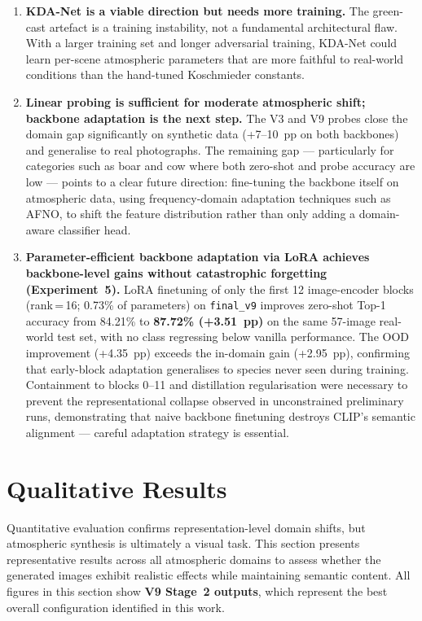 \begin{enumerate}
    \item \textbf{KDA-Net is a viable direction but needs more training.} The green-cast artefact is a training instability, not a fundamental architectural flaw. With a larger training set and longer adversarial training, KDA-Net could learn per-scene atmospheric parameters that are more faithful to real-world conditions than the hand-tuned Koschmieder constants.

    \item \textbf{Linear probing is sufficient for moderate atmospheric shift; backbone adaptation is the next step.} The V3 and V9 probes close the domain gap significantly on synthetic data (+7--10~pp on both backbones) and generalise to real photographs. The remaining gap --- particularly for categories such as boar and cow where both zero-shot and probe accuracy are low --- points to a clear future direction: fine-tuning the backbone itself on atmospheric data, using frequency-domain adaptation techniques such as AFNO, to shift the feature distribution rather than only adding a domain-aware classifier head.

    \item \textbf{Parameter-efficient backbone adaptation via LoRA achieves backbone-level gains without catastrophic forgetting (Experiment~5).} LoRA finetuning of only the first 12 image-encoder blocks (rank\,=\,16; 0.73\% of parameters) on \texttt{final\_v9} improves zero-shot Top-1 accuracy from 84.21\% to \textbf{87.72\% (+3.51~pp)} on the same 57-image real-world test set, with no class regressing below vanilla performance. The OOD improvement (+4.35~pp) exceeds the in-domain gain (+2.95~pp), confirming that early-block adaptation generalises to species never seen during training. Containment to blocks 0--11 and distillation regularisation were necessary to prevent the representational collapse observed in unconstrained preliminary runs, demonstrating that naive backbone finetuning destroys CLIP's semantic alignment --- careful adaptation strategy is essential.
\end{enumerate}

\FloatBarrier
\section{Qualitative Results}
\label{sec:phase2_qualitative}

\noindent Quantitative evaluation confirms representation-level domain shifts, but atmospheric synthesis is ultimately a visual task. This section presents representative results across all atmospheric domains to assess whether the generated images exhibit realistic effects while maintaining semantic content. All figures in this section show \textbf{V9 Stage~2 outputs}, which represent the best overall configuration identified in this work.

